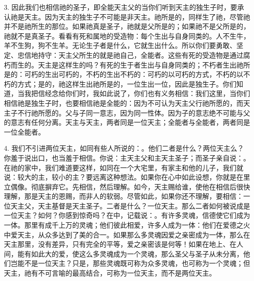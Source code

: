 3. 因此我们也相信祂的圣子，即全能天主父的当你们听到天主的独生子时，要承认祂是天主。因为天主的独生子不可能是非天主。祂所是的，同样生了祂，尽管祂并不是祂所生的那位。如果祂真是圣子，祂就是父所是的；如果祂不是父所是的，祂就不是真圣子。看看有死和属地的受造物：每个生出与自身同类的。人不生牛，羊不生狗，狗不生羊。无论生子者是什么，它就生出什么。所以你们要勇敢、坚定、忠信地持守：天主父所生的就是祂自己，全能者。这些有死的受造物是通过腐朽而生的。天主是这样生的吗？有死的生于者生出与自身同类的；不朽者生出祂所是的：可朽的生出可朽的，不朽的生出不朽的：可朽的以可朽的方式，不朽的以不朽的方式；是的，祂这样生出祂所是的，一位生出一位，因此是独生子。你们知道，当我把信经念给你们时，我如此说了，你们也有义务相信：我们这里，当你们相信祂是独生子时，也要相信祂是全能的：因为不可认为天主父行祂所愿的，而天主子不行祂所愿的。父与子同一意志，因为同一性体。因为子的意志绝不可能与父的意志有任何分离。天主与天主，两者同是一位天主；全能者与全能者，两者同是一位全能者。\par

4. 我们不引进两位天主，如同有些人所说的：。他们二者是什么？两位天主么？你羞于说出口，也当羞于相信。你说：主天主父和主天主圣子；而圣子亲自说：。在祂的家中，我们难道要这样，如同在一个大宅里，有家主和他的儿子，我们就说：较大的主，较小的主？要远离这种想法。如果你在心中如此设想，你就是在里立偶像。彻底摒弃它。先相信，然后理解。如今，天主赐给谁，使他在相信后很快理解，那是天主的恩赐，而非人的软弱。尽管如此，如果你还不理解，要相信：一位天主父，天主基督是天主圣子。二者是什么？一位天主。那么二者如何被说成是一位天主？如何？你感到惊奇吗？在中，记载说：。有许多灵魂，信德使它们成为一体。那里有成千上万的灵魂；他们彼此相爱，许多人成为一体：他们在爱德之火中爱天主，从众多达到了美的合一。如果那么多灵魂因爱之亲密成为一体，那么在天主那里，没有差异，只有完全的平等，爱之亲密该是何等！如果在地上、在人间，能有如此大的爱，使这么多灵魂成为一个灵魂，那么圣父与圣子从未分离，他们岂能不是一位天主？只是，那些灵魂既可称为众多灵魂，也可称为一个灵魂；但天主，祂有不可言喻的最高结合，可称为一位天主，而不是两位天主。\par

